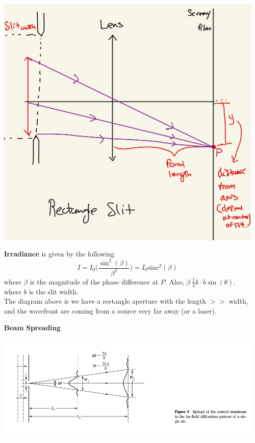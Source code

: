 \documentclass[10pt]{article}
\begin{document}
\newpage

\begin{center}
    \includegraphics*[scale = .1]{imgs/rectangle-app.jpeg}
\end{center}

\textbf{Irradiance} is given by the following 
\[I = I_0\bigg(\frac{\sin^2(\beta)}{\beta^2}\bigg) = I_0 \text{sinc}^2(\beta)\]
where $\beta$ is the magnitude of the phase difference at $P$. Also, $\beta \ \frac{1}{2}k\cdot b \sin(\theta)$, where $b$ is the slit width. \\
The diagram above is we have a rectangle aperture with the length $>>$ width, and the wavefront are coming from a source very far away (or a laser).

\newblock

\textbf{Beam Spreading}

\begin{center}
    \includegraphics*[scale = .75]{imgs/beam-spreading.png}
\end{center}
\end{document}

